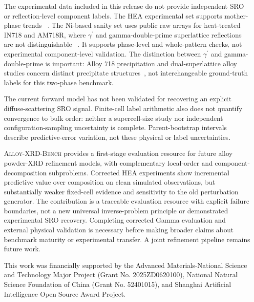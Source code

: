 \documentclass[sigconf,review,anonymous]{acmart}
\newcommand{\dataset}{\textsc{Alloy-XRD-Bench}}
\newcommand{\gp}{\ensuremath{\gamma^{\prime}}}
\newenvironment{revision}{\ifdefined\markedcopy\color{red!70!black}\else\color{black}\fi}{}
\begin{document}
\begin{revision}
The experimental data included in this release do not provide independent
SRO or reflection-level component labels. The HEA experimental set supports mother-phase trends
~\cite{wang2021heaf}. The Ni-based sanity set uses public raw arrays for
heat-treated IN718 and AM718R, where \gp{} and gamma-double-prime superlattice
reflections are not distinguishable
~\cite{markanday2022repairdata,markanday2022repair}. It supports phase-level and
whole-pattern checks, not experimental component-level validation.
The distinction between \gp{} and gamma-double-prime is important: Alloy 718
precipitation and dual-superlattice alloy studies concern distinct precipitate
structures~\cite{devaux2008gamma,mignanelli2017dual}, not interchangeable
ground-truth labels for this two-phase benchmark.
\end{revision}

\begin{revision}
The current forward model has not been validated for recovering an explicit
diffuse-scattering SRO signal. Finite-cell label arithmetic also does not
quantify convergence to bulk order: neither a supercell-size study nor
independent configuration-sampling uncertainty is complete. Parent-bootstrap
intervals describe predictive-error variation, not these physical or label
uncertainties.

\dataset{} provides a first-stage evaluation resource for future alloy
powder-XRD refinement models, with complementary local-order and
component-decomposition subproblems. Corrected HEA experiments show incremental predictive value
over composition on clean simulated observations, but substantially weaker
fixed-cell evidence and sensitivity to the old perturbation generator.
The contribution is a traceable evaluation resource with explicit failure
boundaries, not a new universal inverse-problem principle or demonstrated
experimental SRO recovery. Completing corrected Gamma evaluation and
external physical validation is necessary before making broader claims
about benchmark maturity or experimental transfer.
A joint refinement pipeline remains future work.
\end{revision}

\FloatBarrier
\ifdefined\anonymouscopy
\else
\begin{acks}
\begin{revision}
This work was financially supported by the Advanced Materials-National
Science and Technology Major Project (Grant No. 2025ZD0620100), National
Natural Science Foundation of China (Grant No. 52401015), and Shanghai
Artificial Intelligence Open Source Award Project.
\end{revision}
\end{acks}
\fi


\end{document}
